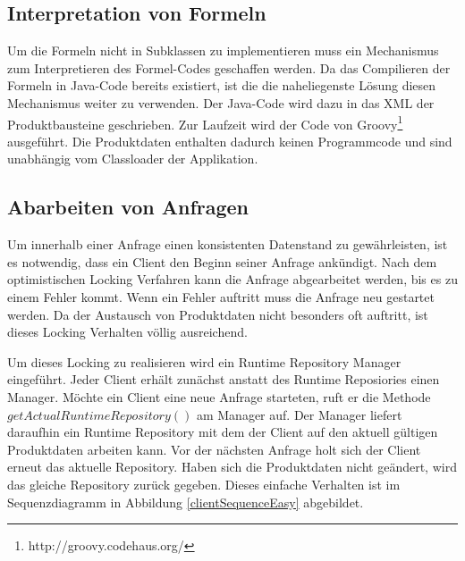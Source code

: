 \documentclass[headsepline=true, footsepline=true]{scrartcl}
\begin{document}
\subsection{Interpretation von Formeln}

Um die Formeln nicht in Subklassen zu implementieren muss ein Mechanismus zum
Interpretieren des Formel-Codes geschaffen werden. Da das Compilieren der Formeln
in Java-Code bereits existiert, ist die die naheliegenste Lösung diesen
Mechanismus weiter zu verwenden. Der Java-Code wird dazu in das XML der
Produktbausteine geschrieben. Zur Laufzeit wird der Code von
Groovy\footnote{http://groovy.codehaus.org/} ausgeführt. Die Produktdaten
enthalten dadurch keinen Programmcode und sind unabhängig vom Classloader der
Applikation.

\subsection{Abarbeiten von Anfragen}

Um innerhalb einer Anfrage einen konsistenten Datenstand zu gewährleisten, ist es
notwendig, dass ein Client den Beginn seiner Anfrage ankündigt. Nach dem
optimistischen Locking Verfahren kann die Anfrage abgearbeitet werden, bis es zu
einem Fehler kommt. Wenn ein Fehler auftritt muss die Anfrage neu gestartet
werden. Da der Austausch von Produktdaten nicht besonders oft auftritt, ist
dieses Locking Verhalten völlig ausreichend.

Um dieses Locking zu realisieren wird ein Runtime Repository Manager eingeführt.
Jeder Client erhält zunächst anstatt des Runtime Reposiories einen Manager.
Möchte ein Client eine neue Anfrage starteten, ruft er die Methode
$getActualRuntimeRepository()$ am Manager auf. Der Manager liefert daraufhin ein
Runtime Repository mit dem der Client auf den aktuell gültigen Produktdaten
arbeiten kann. Vor der nächsten Anfrage holt sich der Client erneut das aktuelle
Repository. Haben sich die Produktdaten nicht geändert, wird das gleiche
Repository zurück gegeben. Dieses einfache Verhalten ist im Sequenzdiagramm in
Abbildung \ref{clientSequenceEasy} abgebildet.
\end{document}
